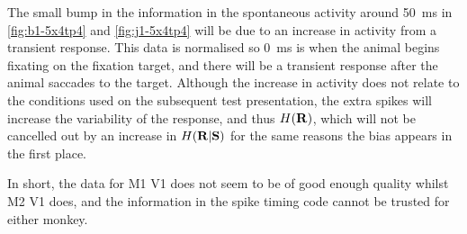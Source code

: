 The small bump in the information in the spontaneous activity around \SI{50}{ms} in \autoref{fig:b1-5x4tp4} and \autoref{fig:j1-5x4tp4} will be due to an increase in activity from a transient response.
This data is normalised so \SI{0}{ms} is when the animal begins fixating on the fixation target, and there will be a transient response after the animal saccades to the target.
Although the increase in activity does not relate to the conditions used on the subsequent test presentation, the extra spikes will increase the variability of the response, and thus $H(\mathbf{R})$, which will not be cancelled out by an increase in $H(\mathbf{R}|\mathbf{S})$ for the same reasons the bias appears in the first place.

In short, the data for \ac{M1} \ac{V1} does not seem to be of good enough quality whilst \ac{M2} \ac{V1} does, and the information in the spike timing code cannot be trusted for either monkey.



